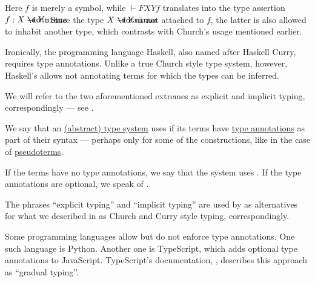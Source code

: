 \begin{remark}
  Here \( f \) is merely a symbol, while \( \vdash FXYf \) translates into the type assertion \( f: X \synimplies Y \). Since the type \( X \synimplies Y \) is not attached to \( f \), the latter is also allowed to inhabit another type, which contrasts with Church's usage mentioned earlier.

  Ironically, the programming language Haskell, also named after Haskell Curry, requires type annotations. Unlike a true Church style type system, however, Haskell's allows not annotating terms for which the types can be inferred.

  We will refer to the two aforementioned extremes as explicit and implicit typing, correspondingly --- see .
\end{remark}

\begin{concept}\label{con:explicit_and_implicit_typing}
  We say that an \hyperref[def:abstract_type_system]{(abstract) type system} uses  if its terms have \hyperref[con:type_annotation]{type annotations} as part of their syntax --- perhaps only for some of the constructions, like in the case of \hyperref[def:pseudoterm]{pseudoterms}.

  If the terms have no type annotations, we say that the system uses . If the type annotations are optional, we speak of .
\end{concept}
\begin{comments}
  \item The phrases \enquote{explicit typing} and \enquote{implicit typing} are used by  as alternatives for what we described in  as Church and Curry style typing, correspondingly.

  \item Some programming languages allow but do not enforce type annotations. One such language is Python. Another one is TypeScript, which adds optional type annotations to JavaScript. TypeScript's documentation, \cite{TypeScript:5.7:handbook}, describes this approach as \enquote{gradual typing}.
\end{comments}
